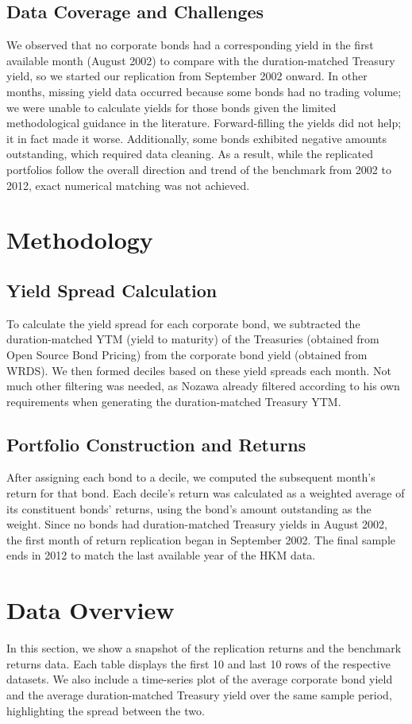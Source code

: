 \documentclass[12pt]{article}
\begin{document}
\subsection{Data Coverage and Challenges}
We observed that no corporate bonds had a corresponding yield in the first available month (August 2002) to compare with the duration-matched Treasury yield, so we started our replication from September 2002 onward. In other months, missing yield data occurred because some bonds had no trading volume; we were unable to calculate yields for those bonds given the limited methodological guidance in the literature. Forward-filling the yields did not help; it in fact made it worse. Additionally, some bonds exhibited negative amounts outstanding, which required data cleaning. As a result, while the replicated portfolios follow the overall direction and trend of the benchmark from 2002 to 2012, exact numerical matching was not achieved.

\section{Methodology}
\subsection{Yield Spread Calculation}
To calculate the yield spread for each corporate bond, we subtracted the duration-matched YTM (yield to maturity) of the Treasuries (obtained from Open Source Bond Pricing) from the corporate bond yield (obtained from WRDS). We then formed deciles based on these yield spreads each month. Not much other filtering was needed, as Nozawa already filtered according to his own requirements when generating the duration-matched Treasury YTM.

\subsection{Portfolio Construction and Returns}
After assigning each bond to a decile, we computed the subsequent month’s return for that bond. Each decile’s return was calculated as a weighted average of its constituent bonds’ returns, using the bond’s amount outstanding as the weight. Since no bonds had duration-matched Treasury yields in August 2002, the first month of return replication began in September 2002. The final sample ends in 2012 to match the last available year of the HKM data.

\section{Data Overview}
In this section, we show a snapshot of the replication returns and the benchmark returns data. Each table displays the first 10 and last 10 rows of the respective datasets. We also include a time-series plot of the average corporate bond yield and the average duration-matched Treasury yield over the same sample period, highlighting the spread between the two.
\end{document}
